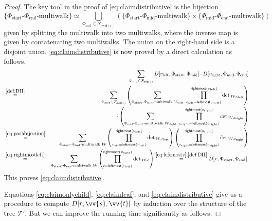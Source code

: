 \documentclass[10pt,a4paper]{article}
\numberwithin{equation}{section}
\theoremstyle{definition}
\newcommand{\CT}{\mathcal{T}}
\newcommand{\CF}{\mathcal{F}}
\newcommand{\CW}{\mathcal{W}}
\begin{document}
\begin{proof}
The key tool in the proof of \eqref{eq:claimdistributive} is the bijection
\begin{equation}\label{eq:pathbijection}
\{\Phi_\text{start}\text{-}\Phi_\text{end}\text{-multiwalk}\} \simeq \bigcup_{\Phi_\text{mid} \in \CF_{\textsf{mid}(v)}} \left(\{\Phi_\text{start}\text{-}\Phi_\text{mid}\text{-multiwalk}\} \times \{\Phi_\text{mid}\text{-}\Phi_\text{end}\text{-multiwalk}\}\right)
\end{equation}
given by splitting the multiwalk into two multiwalks, where the inverse map is given by contatenating two multiwalks. The union on the right-hand side is a disjoint union.
\eqref{eq:claimdistributive} is now proved by a direct calculation as follows.
\begin{eqnarray*}
&&\sum_{\Phi_\text{mid} \in \CF_{\textsf{mid}(v)}} D[v_\text{left},\Phi_\text{start}, \Phi_\text{mid}] \cdot D[v_\text{right},\Phi_\text{mid}, \Phi_\text{end}]
\\
%
%
%
%
%
%
%
%
&\stackrel{\eqref{def:DII}}{=}&
\sum_{\Phi_\text{mid} \in \CF_{\textsf{mid}(v)}}
\left(\sum_{\Phi_\text{start}\text{-}\Phi_\text{mid}\text{-multiwalk } \CW_\text{left}} \ 
\prod_{c_\text{left}=\textsf{leftmost}(v_\text{left})}^{\textsf{rightmost}(v_\text{left})}\det{}_{\CW,c_\text{left}}
\right)\\
&&\hspace{2cm}
\cdot\left(\sum_{\Phi_\text{mid}\text{-}\Phi_\text{end}\text{-multiwalk } \CW_\text{right}} \ 
\prod_{c_\text{right}=\textsf{leftmost}(v_\text{right})}^{\textsf{rightmost}(v_\text{right})}\det{}_{\CW,c_\text{right}}\right)
\\
&\stackrel{\eqref{eq:pathbijection}}{=}&
\sum_{\Phi_\text{start}\text{-}\Phi_\text{end}\text{-multiwalk } \CW} \left(\prod_{c_\text{left}=\textsf{leftmost}(v_\text{left})}^{\textsf{rightmost}(v_\text{left})}\det{}_{\CW,c_\text{left}}\right)
\left(\prod_{c_\text{right}=\textsf{leftmost}(v_\text{right})}^{\textsf{rightmost}(v_\text{right})}\det{}_{\CW,c_\text{right}}\right)
\\
&\stackrel{\eqref{eq:rightmostleft}}{=}&
\sum_{\Phi_\text{start}\text{-}\Phi_\text{end}\text{-multiwalk } \CW} \left(\prod_{c=\textsf{leftmost}(v_\text{left})}^{\textsf{rightmost}(v_\text{right})}\det{}_{\CW,c}\right)
\stackrel{\eqref{eq:leftmostv},\eqref{def:DII}}{=} D[v,\Phi_\text{start},\Phi_\text{end}].
\end{eqnarray*}
This proves \eqref{eq:claimdistributive}.

Equations \eqref{eq:claimonlychild}, \eqref{eq:claimleaf}, and \eqref{eq:claimdistributive} give us a procedure to compute $D[r, \vv{s}, \vv{t}]$ by induction over the structure of the tree $\CT'$.
But we can improve the running time significantly as follows.


\end{proof}
\end{document}
